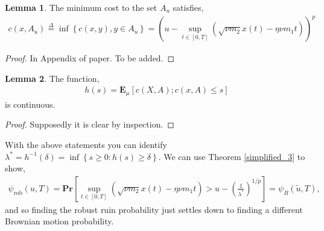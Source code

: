 \documentclass[12pt]{article}
\renewcommand{\Pr}{\textbf{Pr}}
\newcommand{\E}{\textbf{E}}
\newcommand{\define}{\overset{\Delta}{=}}
\theoremstyle{definition}
\theoremstyle{definition}
\newtheorem{lemma}{Lemma}
\theoremstyle{definition}
\begin{document}

\begin{lemma} The minimum cost to the set $A_u$ satisfies,
\begin{align*}
c(x,A_u) \define\inf\left\{c(x,y),y\in A_u\right\} = \left(u-\sup_{t\in[0,T]}\left(\sqrt{\nu m_2}x(t)-\eta \nu m_1t\right)\right)^p
\end{align*}
\begin{proof}
In Appendix of paper. To be added.
\end{proof}
\end{lemma}

\begin{lemma} The function,
\begin{align*}
h(s)=\E_{\mu}\left[c(X,A); c(x,A)\leq s\right]
\end{align*}
is continuous. 
\end{lemma}
\begin{proof} Supposedly it is clear by inspection.
\end{proof}

With the above statements you can identify $\lambda^*=h^{-1}(\delta)=\inf\left\{s\geq 0 : h(s)\geq \delta\right\}$. We can use Theorem \ref{simplified_3} to show,
\begin{align*}
\psi_{\text{rob}}(u,T)= \Pr\left[\sup_{t\in[0,T]} \left(\sqrt{\nu m_2}x(t)-\eta \nu m_1t\right)>u -\left(\frac{1}{\lambda^*}\right)^{1/p}\right] = \psi_B(\tilde u, T),
\end{align*}
and so finding the robust ruin probability just settles down to finding a different Brownian motion probability. 
\end{document}
